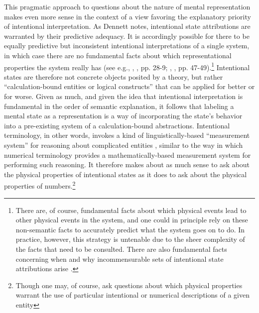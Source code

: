 This pragmatic approach to questions about the nature of mental representation makes even more sense in the context of a view favoring the explanatory priority of intentional interpretation. As Dennett \citep{Dennett:1987,Dennett:1991} notes, intentional state attributions are warranted by their predictive adequacy. It is accordingly possible for there to be equally predictive but inconsistent intentional interpretations of a single system, in which case there are no fundamental facts about which representational properties the system really has (see e.g., \citeauthor{Dennett:1987}, \citeyear{Dennett:1987}, pp. 28-9; \citeauthor{Dennett:1991}, \citeyear{Dennett:1991}, pp. 47-49).\footnote{There are, of course, fundamental facts about which physical events lead to other physical events in the system, and one could in principle rely on these non-semantic facts to accurately predict what the system goes on to do. In practice, however, this strategy is untenable due to the sheer complexity of the facts that need to be consulted. There are also fundamental facts concerning when and why incommensurable sets of intentional state attributions arise \citep{Dennett:1987}.} Intentional states are therefore not concrete objects posited by a theory, but rather ``calculation-bound entities or logical constructs'' \citep[][p. 53]{Dennett:1987} that can be applied for better or for worse. Given as much, and given the idea that intentional interpretation is fundamental in the order of semantic explanation, it follows that labeling a mental state as a representation is a way of incorporating the state's behavior into a pre-existing system of a calculation-bound abstractions. Intentional terminology, in other words, invokes a kind of linguistically-based ``measurement system'' for reasoning about complicated entities \citep[][p. 306]{Brandom:2010b}, similar to the way in which numerical terminology provides a mathematically-based measurement system for performing such reasoning. It therefore makes about as much sense to ask about the physical properties of intentional states as it does to ask about the physical properties of numbers.\footnote{Though one may, of course, ask questions about which physical properties warrant the use of particular intentional or numerical descriptions of a given entity}

